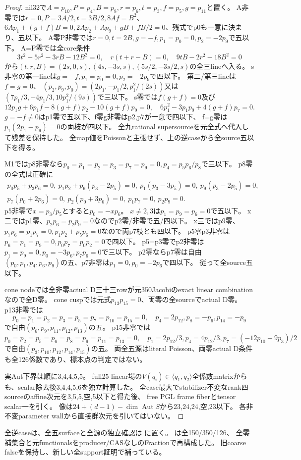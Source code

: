 \documentclass[a4paper,11pt]{ltjsarticle}
\theoremstyle{definition}
\begin{document}
\begin{proof}
nil32で$A=p_{10},P=p_4,B=p_8,r=p_6,t=p_3,f=p_5,g=p_{11}$と置く。
A非零では$r=0,P=3A/2,t=3B/2,8Af=B^2$、
$6Ap_1+(g+f)B=0,2Ap_2+Ap_9+gB+fB/2=0$、残式でp0も一意に決まり、五以下。
A零P非零では$r=0,t=2B,g=-f,p_1=p_0=0,p_2=-2p_9$で五以下。
A=P零では全core条件
\[
 3t^2-5r^2-3rB-12B^2=0,\quad r(t+r-B)=0,\quad9tB-2r^2-18B^2=0
\]
から$(t,r,B)=(2s,0,s),(4s,-3s,s),(5s/2,-3s/2,s)$の全三lineへ入る。
s非零の第一lineは$g=-f,p_1=p_0=0,p_2=-2p_9$で四以下。
第二/第三lineは$f=g=0$、
$(p_2,p_9,p_0)=(2p_1,-p_1/2,p_1^2/(2s))$又は
$(7p_1/3,-4p_1/3,10p_1^2/(9s))$で三以下。
s零では$f(g+f)=0$及び
\[
 12p_1g+6p_1f-8(g+f)p_2-10(g+f)p_9=0,\quad
 6p_1^2-3p_1p_9+4(g+f)p_7=0.
\]
$g=-f\ne0$はp1零で五以下、f零g非零はp2,p7が一意で四以下、
f=g零は$p_1(2p_1-p_9)=0$の両枝が四以下。
全九rational supersourceを元全式へ代入して残差を保持した。
全map値をPoissonと主張せず、上の逆caseから全source五以下を得る。

M1ではp8非零なら$p_0=p_1=p_2=p_3=p_7=p_9=0,p_4=p_5p_6/p_8$で三以下。
p8零の全式は正確に
\[
\begin{gathered}
 p_0p_5+p_3p_6=0,\ p_1p_2+p_6(p_3-2p_5)=0,\ p_1(p_3-3p_5)=0,\ p_9(p_3-2p_5)=0,\\
 p_7(p_0+2p_6)=0,\ p_2(p_0+3p_6)=0,\ p_1p_7=0,\ p_2p_9=0.
\end{gathered}
\]
p5非零で$x=p_3/p_5$とすると$p_0=-xp_6$。
$x\ne2,3$は$p_1=p_9=p_6=0$で五以下。
x二ではp1零、$p_2p_6=p_2p_9=0$なのでp2零/非零で五/四以下。
x三ではp9零、$p_7p_6=p_1p_7=0,p_1p_2+p_5p_6=0$なので両p7枝とも四以下。
p5零p3非零は$p_6=p_1=p_9=0,p_0p_7=p_0p_2=0$で四以下。
p5=p3零でp2非零は$p_1=p_9=0,p_0=-3p_6,p_7p_6=0$で三以下。
p2零ならp7零は自由$(p_0,p_1,p_4,p_6,p_9)$の五、p7非零は$p_1=0,p_0=-2p_6$で四以下。
従って全source五以下。

cone nodeでは全非零actual D三十三rowが元350Jacobiのexact linear combinationなので全D零。
cone cuspでは元式$p_{13}p_{15}=0$、両零の全sourceでactual D零。
p13非零では
\[
 p_0=p_1=p_2=p_3=p_5=p_7=p_{10}=p_{15}=0,\quad
 p_4=2p_{12},p_8=-p_6,p_{14}=-p_9
\]
で自由$(p_6,p_9,p_{11},p_{12},p_{13})$の五。
p15非零では
\[
 p_0=p_2=p_5=p_6=p_8=p_9=p_{11}=p_{13}=0,\quad
 p_1=2p_{12}/3,p_4=4p_{12}/3,p_7=(-12p_{10}+9p_3)/2
\]
で自由$(p_3,p_{10},p_{12},p_{14},p_{15})$の五。
両全五源はliteral Poisson、両零actual D条件も全126係数であり、標本点の判定ではない。

実Aut下界は順に3,4,4,5,5。
full25 linear場の$V(q_i)\in\langle q_1,q_2\rangle$全係数matrixからも、scalar除去後3,4,4,5,6を独立計算した。
全case最大でstabilizer不変なrank四sourceのaffine次元を3,5,5,空,5以下と得た後、
free PGL frame fiberとtensor scalar一を引く。
像は$24+(d-1)-\dim\operatorname{Aut}S$から23,24,24,空,23以下。
各非不変parameter wallから直接群次元を引いてはいない。
\end{proof}
全逆caseは、全五surfaceと全源の独立確認は
に置く。
は全150/350/126、
全零補集合と元functionalsをproducer/CASなしのFractionで再構成した。
旧coarse falseを保持し、新しい全support証明で補っている。
\end{document}
